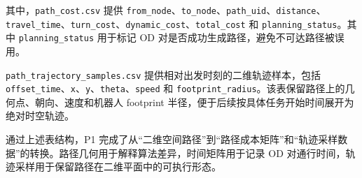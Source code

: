 其中，\verb|path_cost.csv| 提供 \verb|from_node|、\verb|to_node|、\verb|path_uid|、\verb|distance|、\verb|travel_time|、\verb|turn_cost|、\verb|dynamic_cost|、\verb|total_cost| 和 \verb|planning_status|。其中 \verb|planning_status| 用于标记 OD 对是否成功生成路径，避免不可达路径被误用。

\verb|path_trajectory_samples.csv| 提供相对出发时刻的二维轨迹样本，包括 \verb|offset_time|、\verb|x|、\verb|y|、\verb|theta|、\verb|speed| 和 \verb|footprint_radius|。该表保留路径上的几何点、朝向、速度和机器人 footprint 半径，便于后续按具体任务开始时间展开为绝对时空轨迹。

通过上述表结构，P1 完成了从“二维空间路径”到“路径成本矩阵”和“轨迹采样数据”的转换。路径几何用于解释算法差异，时间矩阵用于记录 OD 对通行时间，轨迹采样用于保留路径在二维平面中的可执行形态。
